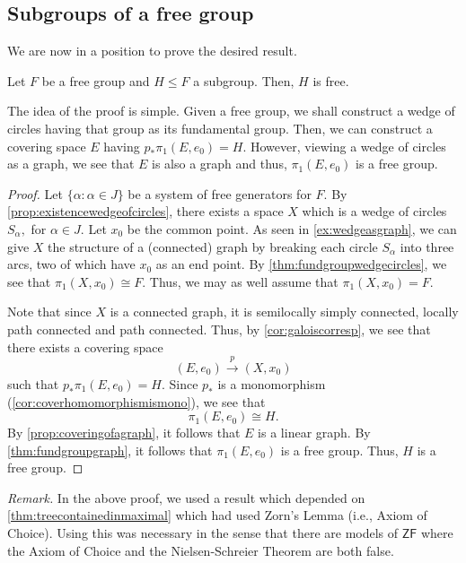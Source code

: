 \documentclass[12pt]{article}
\begin{document}
\subsection{Subgroups of a free group}

We are now in a position to prove the desired result.

\begin{thm} \label{thm:nielsenschreier}
	Let $F$ be a free group and $H \le F$ a subgroup. Then, $H$ is free.
\end{thm}
The idea of the proof is simple. Given a free group, we shall construct a wedge of circles having that group as its fundamental group. Then, we can construct a covering space $E$ having $p_*\pi_1(E, e_0) = H.$ However, viewing a wedge of circles as a graph, we see that $E$ is also a graph and thus, $\pi_1(E, e_0)$ is a free group.
\begin{proof} 
	Let $\{\alpha : \alpha \in J\}$ be a system of free generators for $F.$ By \cref{prop:existencewedgeofcircles}, there exists a space $X$ which is a wedge of circles $S_\alpha,$ for $\alpha \in J.$ Let $x_0$ be the common point. As seen in \cref{ex:wedgeasgraph}, we can give $X$ the structure of a (connected) graph by breaking each circle $S_\alpha$ into three arcs, two of which have $x_0$ as an end point. By \cref{thm:fundgroupwedgecircles}, we see that $\pi_1(X, x_0) \cong F.$ Thus, we may as well assume that $\pi_1(X, x_0) = F.$ 

	Note that since $X$ is a connected graph, it is semilocally simply connected, locally path connected and path connected. Thus, by \cref{cor:galoiscorresp}, we see that there exists a covering space
	\begin{equation*} 
		(E, e_0) \overset{p}{\longrightarrow} (X, x_0)
	\end{equation*}
	such that $p_*\pi_1(E, e_0) = H.$ Since $p_*$ is a monomorphism (\cref{cor:coverhomomorphismismono}), we see that
	\begin{equation*} 
		\pi_1(E, e_0) \cong H.
	\end{equation*}
	By \cref{prop:coveringofagraph}, it follows that $E$ is a linear graph. By \cref{thm:fundgroupgraph}, it follows that $\pi_1(E, e_0)$ is a free group. Thus, $H$ is a free group.
\end{proof}

\emph{Remark.} In the above proof, we used a result which depended on \cref{thm:treecontainedinmaximal} which had used Zorn's Lemma (i.e., Axiom of Choice). Using this was necessary in the sense that there are models of $\mathsf{ZF}$ where the Axiom of Choice and the Nielsen-Schreier Theorem are both false.
\end{document}
